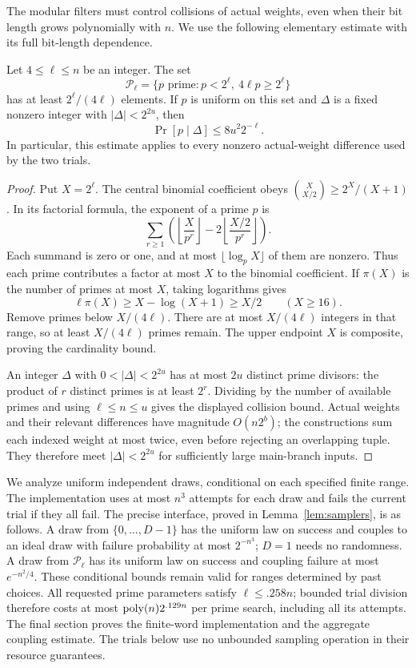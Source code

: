 The modular filters must control collisions of actual weights, even
when their bit length grows polynomially with $n$. We use the
following elementary estimate with its full bit-length dependence.

\begin{lemma}
\label{lem:prime}
Let $4\le\ell\le n$ be an integer. The set
\[
 \mathcal P_\ell=
 \{p\text{ prime}:p<2^\ell,\ 4\ell p\ge2^\ell\}
\]
has at least $2^\ell/(4\ell)$ elements. If $p$ is uniform on this
set and $\Delta$ is a fixed nonzero integer with
$|\Delta|<2^{2u}$, then
\[
 \Pr[p\mid\Delta]\le 8u^2 2^{-\ell}.
\]
In particular, this estimate applies to every nonzero actual-weight
difference used by the two trials.
\end{lemma}

\begin{proof}
Put $X=2^\ell$. The central binomial coefficient obeys
$\binom{X}{X/2}\ge2^X/(X+1)$. In its factorial formula, the
exponent of a prime $p$ is
\[
 \sum_{r\ge1}
 \left(\left\lfloor\frac X{p^r}\right\rfloor
      -2\left\lfloor\frac {X/2}{p^r}\right\rfloor\right).
\]
Each summand is zero or one, and at most
$\lfloor\log_p X\rfloor$ of them are nonzero. Thus each prime
contributes a factor at most $X$ to the binomial coefficient. If
$\pi(X)$ is the number of primes at most $X$, taking logarithms gives
\[
 \ell\pi(X)\ge X-\log(X+1)\ge X/2
 \qquad(X\ge16).
\]
Remove primes below $X/(4\ell)$. There are at most $X/(4\ell)$
integers in that range, so at least $X/(4\ell)$ primes remain.
The upper endpoint $X$ is composite, proving the cardinality bound.

An integer $\Delta$ with $0<|\Delta|<2^{2u}$ has at most $2u$
distinct prime divisors: the product of $r$ distinct primes is at
least $2^r$. Dividing by the number of available primes and using
$\ell\le n\le u$ gives the displayed collision bound.
Actual weights and their relevant differences have magnitude
$O(n2^b)$; the constructions sum each indexed weight at most twice,
even before rejecting an overlapping tuple. They therefore meet
$|\Delta|<2^{2u}$ for sufficiently large main-branch inputs.
\end{proof}

We analyze uniform independent draws, conditional on each specified
finite range. The implementation uses at most $n^3$ attempts for each
draw and fails the current trial if they all fail. The precise
interface, proved in Lemma~\ref{lem:samplers}, is as follows. A draw
from $\{0,\ldots,D-1\}$ has the uniform law on success and couples
to an ideal draw with failure probability at most $2^{-n^3}$;
$D=1$ needs no randomness. A draw from $\mathcal P_\ell$ has its
uniform law on success and coupling failure at most $e^{-n^2/4}$.
These conditional bounds remain valid for ranges determined by past
choices. All requested prime parameters satisfy $\ell\le.258n$;
bounded trial division therefore costs at most
$\operatorname{poly}(n)2^{.129n}$ per prime search, including all its attempts.
The final section proves the finite-word implementation and the
aggregate coupling estimate. The trials below use no unbounded
sampling operation in their resource guarantees.
